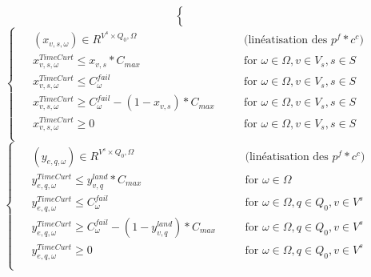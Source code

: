 \documentclass[a4paper,12pt]{article}
\begin{document}
\begin {enumerate}
{\begin{equation}
\begin{cases}
\begin{alignedat}{2}
            \end{alignedat}
        \end{cases}
    \end{equation}
    \begin{equation}
        \begin{cases}
            \begin{alignedat}{2}
                & (x_{v,s,\omega}) \in R^{V^{s} \times Q_{0}, \Omega} && \quad \text{(linéatisation des } p^{f}*c^{c} \text{)}\\
                & x_{v,s,\omega}^{TimeCurt} \leq x_{v,s}*C_{max} &&\quad \text{for } \omega \in\Omega, v \in V_{s}, s \in S\\
                & x_{v,s,\omega}^{TimeCurt} \leq C_{\omega}^{fail} &&\quad \text{for } \omega \in\Omega, v \in V_{s}, s \in S\\
                & x_{v,s,\omega}^{TimeCurt} \geq C_{\omega}^{fail}-(1-x_{v,s})*C_{max} &&\quad \text{for } \omega \in\Omega, v \in V_{s}, s \in S\\
                & x_{v,s,\omega}^{TimeCurt} \geq 0 &&\quad \text{for } \omega \in\Omega, v \in V_{s}, s \in S\\
            \end{alignedat}
        \end{cases}
    \end{equation}
    \begin{equation}
        \begin{cases}
            \begin{alignedat}{2}
                & (y_{e,q,\omega}) \in R^{V^{s} \times Q_{0}, \Omega} && \quad \text{(linéatisation des } p^{f}*c^{c} \text{)} \\
                & y_{e,q,\omega}^{TimeCurt} \leq y_{v,q}^{land} * C_{max} &&\quad \text{for } \omega \in \Omega \\
                & y_{e,q,\omega}^{TimeCurt} \leq C_{\omega}^{fail} &&\quad \text{for } \omega \in\Omega, q \in Q_{0}, v \in V^{s}\\
                & y_{e,q,\omega}^{TimeCurt} \geq C_{\omega}^{fail}-(1-y_{v,q}^{land})*C_{max} &&\quad \text{for } \omega \in\Omega, q \in Q_{0}, v \in V^{s}\\
                & y_{e,q,\omega}^{TimeCurt} \geq 0 &&\quad \text{for } \omega \in \Omega, q \in Q_{0}, v \in V^{s}\\
            \end{alignedat}
        \end{cases}
    \end{equation}
}
\end{enumerate}
\end{document}
